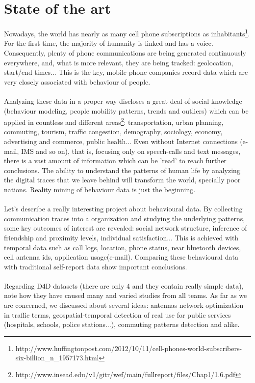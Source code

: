 \newpage

\section{State of the art}

Nowadays, the world has nearly as many cell phone subscriptions as inhabitants\footnote{http://www.huffingtonpost.com/2012/10/11/cell-phones-world-subscribers-six-billion\_n\_1957173.html}. For the first time, the majority of humanity is linked and has a voice. Consequently, plenty of phone communications are being generated continuously everywhere, and, what is more relevant, they are being tracked: geolocation, start/end times... This is the key, mobile phone companies record data which are very closely associated with behaviour of people.
\\
\\
Analyzing these data in a proper way discloses a great deal of social knowledge (behaviour modeling, people mobility patterns, trends and outliers) which can be applied in countless and different areas\footnote{http://www.insead.edu/v1/gitr/wef/main/fullreport/files/Chap1/1.6.pdf}: transportation, urban planning, commuting, tourism, traffic congestion, demography, sociology, economy, advertising and commerce, public health... Even without Internet connections (e-mail, IMS and so on), that is, focusing only on speech-calls and text messages, there is a vast amount of information which can be 'read' to reach further conclusions. The ability to understand the patterns of human life by analyzing the digital traces that we leave behind will transform the world, specially poor nations. Reality mining of behaviour data is just the beginning.
\\
\\
Let's describe a really interesting project \citep{eage09} about behavioural data. By collecting communication traces into a organization and studying the underlying patterns, some key outcomes of interest are revealed: social network structure, inference of friendship and proximity levels, individual satisfaction... This is achieved with temporal data such as call logs, location, phone status, near bluetooth devices, cell antenna ids, application usage(e-mail). Comparing these behavioural data with traditional self-report data show important conclusions.
\\
\\
Regarding D4D datasets (there are only 4 and they contain really simple data), note how they have caused many and varied studies from all teams. As far as we are concerned, we discussed about several ideas: antennas network optimization in traffic terms, geospatial-temporal detection of real use for public services (hospitals, schools, police stations...), commuting patterns detection and alike.
